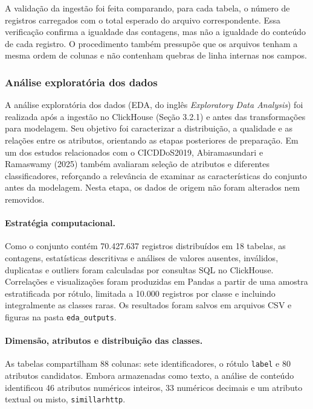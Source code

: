\documentclass[
    12pt,                %
    openright,           %
    oneside,             %
    a4paper,             %
    english,             %
    brazil               %
]{abntex2}
\begin{document}
A validação da ingestão foi feita comparando, para cada tabela, o número de registros carregados com o total esperado do arquivo correspondente. Essa verificação confirma a igualdade das contagens, mas não a igualdade do conteúdo de cada registro. O procedimento também pressupõe que os arquivos tenham a mesma ordem de colunas e não contenham quebras de linha internas nos campos.

\subsubsection{Análise exploratória dos dados}
\label{sec:analise-exploratoria}

A análise exploratória dos dados (EDA, do inglês \textit{Exploratory Data Analysis}) foi realizada após a ingestão no ClickHouse (Seção 3.2.1) e antes das transformações para modelagem. Seu objetivo foi caracterizar a distribuição, a qualidade e as relações entre os atributos, orientando as etapas posteriores de preparação. Em um dos estudos relacionados com o CICDDoS2019, Abiramasundari e Ramaswamy (2025) também avaliaram seleção de atributos e diferentes classificadores, reforçando a relevância de examinar as características do conjunto antes da modelagem. Nesta etapa, os dados de origem não foram alterados nem removidos.

\paragraph{Estratégia computacional.}
Como o conjunto contém 70.427.637 registros distribuídos em 18 tabelas, as contagens, estatísticas descritivas e análises de valores ausentes, inválidos, duplicatas e outliers foram calculadas por consultas SQL no ClickHouse. Correlações e visualizações foram produzidas em Pandas a partir de uma amostra estratificada por rótulo, limitada a 10.000 registros por classe e incluindo integralmente as classes raras. Os resultados foram salvos em arquivos CSV e figuras na pasta \texttt{eda\_outputs}.

\paragraph{Dimensão, atributos e distribuição das classes.}
As tabelas compartilham 88 colunas: sete identificadores, o rótulo \texttt{label} e 80 atributos candidatos. Embora armazenadas como texto, a análise de conteúdo identificou 46 atributos numéricos inteiros, 33 numéricos decimais e um atributo textual ou misto, \texttt{simillarhttp}.
\end{document}
